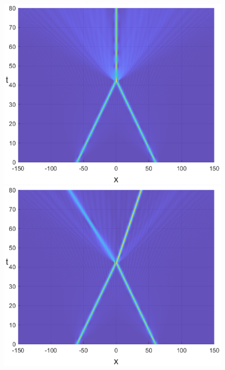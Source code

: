 \documentclass[preprint,12pt]{elsarticle}
\begin{document}
\begin{figure}[H]
\begin{minipage}[h]{0.32\linewidth}
\includegraphics[width=1\linewidth]{fig54.eps}
\end{minipage}
\begin{minipage}[h]{0.32\linewidth}
\includegraphics[width=1\linewidth]{fig57.eps}
\end{minipage}

\end{figure}
\end{document}
